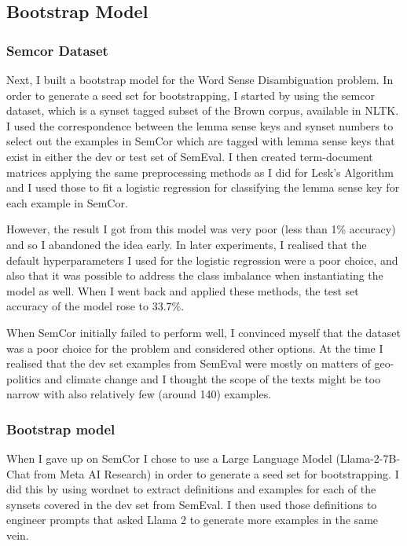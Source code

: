 \documentclass[
10pt, %
a4paper, %
oneside, %
headinclude,footinclude, %
BCOR5mm, %
]{scrartcl}
\begin{document}
\subsection{Bootstrap Model}

\subsubsection{Semcor Dataset}
Next, I built a bootstrap model for the Word Sense Disambiguation problem. In order to generate a seed set for bootstrapping, I started by using the semcor dataset, which is a synset tagged subset of the Brown corpus, available in NLTK. I used the correspondence between the lemma sense keys and synset numbers to select out the examples in SemCor which are tagged with lemma sense keys that exist in either the dev or test set of SemEval. I then created term-document matrices applying the same preprocessing methods as I did for Lesk's Algorithm and I used those to fit a logistic regression for classifying the lemma sense key for each example in SemCor.

However, the result I got from this model was very poor (less than 1\% accuracy) and so I abandoned the idea early. In later experiments, I realised that the default hyperparameters I used for the logistic regression were a poor choice, and also that it was possible to address the class imbalance when instantiating the model as well. When I went back and applied these methods, the test set accuracy of the model rose to 33.7\%.

When SemCor initially failed to perform well, I convinced myself that the dataset was a poor choice for the problem and considered other options. At the time I realised that the dev set examples from SemEval were mostly on matters of geo-politics and climate change and I thought the scope of the texts might be too narrow with also relatively few (around 140) examples.

\subsubsection{Bootstrap model}

When I gave up on SemCor I chose to use a Large Language Model (Llama-2-7B-Chat from Meta AI Research) in order to generate a seed set for bootstrapping. I did this by using wordnet to extract definitions and examples for each of the synsets covered in the dev set from SemEval. I then used those definitions to engineer prompts that asked Llama 2 to generate more examples in the same vein.
\end{document}

